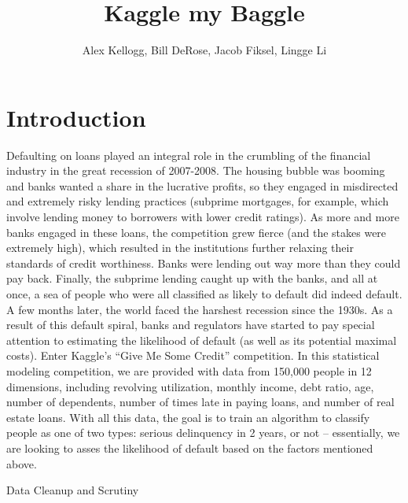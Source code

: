 \documentclass[11pt, oneside]{article}   	%
\title{Kaggle my Baggle}
\author{Alex Kellogg, Bill DeRose, Jacob Fiksel, Lingge Li}
\begin{document}
\maketitle
\section{Introduction}
	Defaulting on loans played an integral role in the crumbling of the financial industry in the great recession of 2007-2008. The housing bubble was booming and banks wanted a share in the lucrative profits, so they engaged in misdirected and extremely risky lending practices (subprime mortgages, for example, which involve lending money to borrowers with lower credit ratings). As more and more banks engaged in these loans, the competition grew fierce (and the stakes were extremely high), which resulted in the institutions further relaxing their standards of credit worthiness. Banks were lending out way more than they could pay back. Finally, the subprime lending caught up with the banks, and all at once, a sea of people who were all classified as likely to default did indeed default. A few months later, the world faced the harshest recession since the 1930s. As a result of this default spiral, banks and regulators have started to pay special attention to estimating the likelihood of default (as well as its potential maximal costs). 
Enter Kaggle’s “Give Me Some Credit” competition. In this statistical modeling competition, we are provided with data from 150,000 people in 12 dimensions, including revolving utilization, monthly income, debt ratio, age, number of dependents, number of times late in paying loans, and number of real estate loans. With all this data, the goal is to train an algorithm to classify people as one of two types: serious delinquency in 2 years, or not – essentially, we are looking to asses the likelihood of default based on the factors mentioned above.

Data Cleanup and Scrutiny
\end{document}
